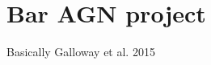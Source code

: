 
\chapter{Bar AGN project}
\label{chap:baragn}



Basically Galloway et al. 2015 \citet{Muzahid2015}
